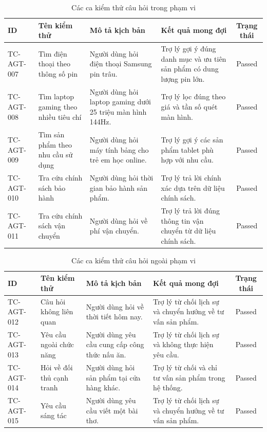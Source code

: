 \begin{table}[H]
\centering
\caption{Các ca kiểm thử câu hỏi trong phạm vi}
\label{tab:tc_agent_inscope}
\small
\begin{tabularx}{\textwidth}{|l|X|X|X|c|}
\hline
\textbf{ID} & \textbf{Tên kiểm thử} & \textbf{Mô tả kịch bản} & \textbf{Kết quả mong đợi} & \textbf{Trạng thái} \\ \hline
TC-AGT-007 & Tìm điện thoại theo thông số pin & Người dùng hỏi điện thoại Samsung pin trâu. & Trợ lý gợi ý đúng danh mục và ưu tiên sản phẩm có dung lượng pin lớn. & Passed \\ \hline
TC-AGT-008 & Tìm laptop gaming theo nhiều tiêu chí & Người dùng hỏi laptop gaming dưới 25 triệu màn hình 144Hz. & Trợ lý lọc đúng theo giá và tần số quét màn hình. & Passed \\ \hline
TC-AGT-009 & Tìm sản phẩm theo nhu cầu sử dụng & Người dùng hỏi máy tính bảng cho trẻ em học online. & Trợ lý gợi ý các sản phẩm tablet phù hợp với nhu cầu. & Passed \\ \hline
TC-AGT-010 & Tra cứu chính sách bảo hành & Người dùng hỏi thời gian bảo hành sản phẩm. & Trợ lý trả lời chính xác dựa trên dữ liệu chính sách. & Passed \\ \hline
TC-AGT-011 & Tra cứu chính sách vận chuyển & Người dùng hỏi về phí vận chuyển. & Trợ lý trả lời đúng thông tin vận chuyển từ dữ liệu chính sách. & Passed \\ \hline
\end{tabularx}
\end{table}

\begin{table}[H]
\centering
\caption{Các ca kiểm thử câu hỏi ngoài phạm vi}
\label{tab:tc_agent_outscope}
\small
\begin{tabularx}{\textwidth}{|l|X|X|X|c|}
\hline
\textbf{ID} & \textbf{Tên kiểm thử} & \textbf{Mô tả kịch bản} & \textbf{Kết quả mong đợi} & \textbf{Trạng thái} \\ \hline
TC-AGT-012 & Câu hỏi không liên quan & Người dùng hỏi về thời tiết hôm nay. & Trợ lý từ chối lịch sự và chuyển hướng về tư vấn sản phẩm. & Passed \\ \hline
TC-AGT-013 & Yêu cầu ngoài chức năng & Người dùng yêu cầu cung cấp công thức nấu ăn. & Trợ lý từ chối lịch sự và không thực hiện yêu cầu. & Passed \\ \hline
TC-AGT-014 & Hỏi về đối thủ cạnh tranh & Người dùng hỏi sản phẩm tại cửa hàng khác. & Trợ lý từ chối và chỉ tư vấn sản phẩm trong hệ thống. & Passed \\ \hline
TC-AGT-015 & Yêu cầu sáng tác & Người dùng yêu cầu viết một bài thơ. & Trợ lý từ chối lịch sự và chuyển hướng về tư vấn sản phẩm. & Passed \\ \hline
\end{tabularx}
\end{table}

